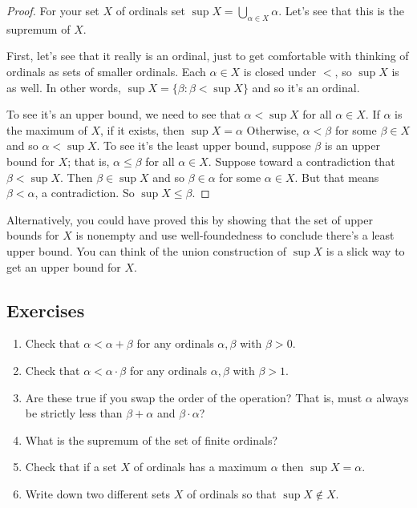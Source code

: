 \documentclass[10pt]{amsart}
\begin{document}
\begin{proof}
For your set $X$ of ordinals set $\sup X = \bigcup_{\alpha \in X} \alpha$. Let's see that this is the supremum of $X$.

First, let's see that it really is an ordinal, just to get comfortable with thinking of ordinals as sets of smaller ordinals. Each $\alpha \in X$ is closed under $<$, so $\sup X$ is as well. In other words, $\sup X = \{ \beta : \beta < \sup X\}$ and so it's an ordinal.

To see it's an upper bound, we need to see that $\alpha < \sup X$ for all $\alpha \in X$. If $\alpha$ is the maximum of $X$, if it exists, then $\sup X = \alpha$ Otherwise, $\alpha < \beta$ for some $\beta \in X$ and so $\alpha < \sup X$.
To see it's the least upper bound, suppose $\beta$ is an upper bound for $X$; that is, $\alpha \le \beta$ for all $\alpha \in X$.
Suppose toward a contradiction that $\beta < \sup X$. Then $\beta \in \sup X$ and so $\beta \in \alpha$ for  some $\alpha \in X$. But that means $\beta < \alpha$, a contradiction. So $\sup X \le \beta$.
\end{proof}

Alternatively, you could have proved this by showing that the set of upper bounds for $X$ is nonempty and use well-foundedness to conclude there's a least upper bound. You can think of the union construction of $\sup X$ is a slick way to get an upper bound for $X$.

\subsection*{Exercises}

\begin{enumerate}
\item Check that $\alpha < \alpha + \beta$ for any ordinals $\alpha,\beta$ with $\beta > 0$.
\item Check that $\alpha < \alpha \cdot \beta$ for any ordinals $\alpha,\beta$ with $\beta > 1$.
\item Are these true if you swap the order of the operation? That is, must $\alpha$ always be strictly less than $\beta + \alpha$ and $\beta \cdot \alpha$?
\item What is the supremum of the set of finite ordinals? 
\item Check that if a set $X$ of ordinals has a maximum $\alpha$ then $\sup X = \alpha$.
\item Write down two different sets $X$ of ordinals so that $\sup X \not \in X$.
\end{enumerate}
\end{document}
